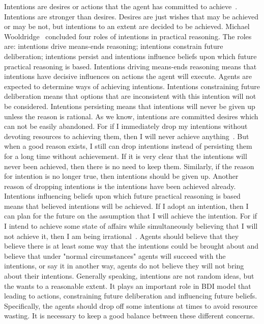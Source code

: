 Intentions are desires or actions that the agent has committed to achieve~\cite{Alejandro_LearnBDI_2004}.
Intentions are stronger than desires.
Desires are just wishes that may be achieved or may be not, but intentions to an extent are decided to be achieved.
Michael Wooldridge~\cite{Gerhard_MultiSystem_1999} concluded four roles of intentions in practical reasoning.
The roles are: intentions drive means-ends reasoning; intentions constrain future deliberation; intentions persist and intentions influence beliefs upon which future practical reasoning is based.
Intentions driving means-ends reasoning means that intentions have decisive influences on actions the agent will execute.
Agents are expected to determine ways of achieving intentions.
Intentions constraining future deliberation means that options that are inconsistent with this intention will not be considered.
Intentions persisting means that intentions will never be given up unless the reason is rational.
As we know, intentions are committed desires which can not be easily abandoned.
For if I immediately drop my intentions without devoting resources to achieving them, then I will never achieve anything~\cite{Gerhard_MultiSystem_1999}.
But when a good reason exists, I still can drop intentions instead of persisting them for a long time without achievement.
If it is very clear that the intentions will never been achieved, then there is no need to keep them.
Similarly, if the reason for intention is no longer true, then intentions should be given up.
Another reason of dropping intentions is the intentions have been achieved already.
Intentions influencing beliefs upon which future practical reasoning is based means that believed intentions will be achieved.
If I adopt an intention, then I can plan for the future on the assumption that I will achieve the intention.
For if I intend to achieve some state of affairs while simultaneously believing that I will not achieve it, then I am being irrational~\cite{Gerhard_MultiSystem_1999}.
Agents should believe that they believe there is at least some way that the intentions could be brought about and believe that under "normal circumstances" agents will succeed with the intentions, or say it in another way, agents do not believe they will not bring about their intentions.
Generally speaking, intentions are not random ideas, but the wants to a reasonable extent.
It plays an important role in BDI model that leading to actions, constraining future deliberation and influencing future beliefs.
Specifically, the agents should drop off some intentions at times to avoid resource wasting.
It is necessary to keep a good balance between these different concerns.


